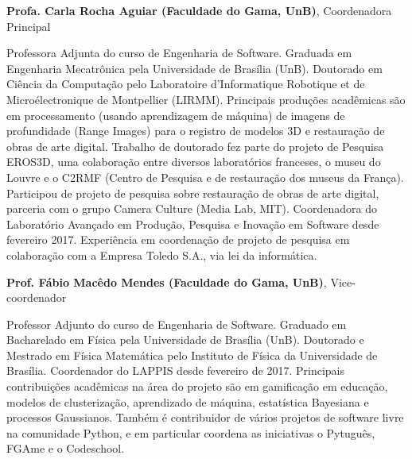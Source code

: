 \textbf{Profa. Carla Rocha Aguiar (Faculdade do Gama, UnB)}, Coordenadora Principal

Professora Adjunta do curso de Engenharia de Software. Graduada em Engenharia Mecatrônica pela Universidade de Brasília (UnB).
Doutorado em Ciência da Computação pelo Laboratoire d'Informatique Robotique et de Microélectronique de Montpellier (LIRMM). 
Principais produções
acadêmicas são em processamento (usando aprendizagem de máquina) de imagens de profundidade (Range Images) para o registro de modelos 3D e
restauração de obras de arte digital. 
Trabalho de doutorado fez parte do projeto de Pesquisa EROS3D, uma colaboração entre diversos laboratórios franceses, o museu do 
Louvre e o C2RMF (Centro de Pesquisa e de restauração dos museus da França). Participou de projeto de pesquisa sobre restauração
de obras de arte digital, parceria com o grupo Camera Culture (Media Lab, MIT).
Coordenadora do Laboratório Avançado em Produção, Pesquisa e Inovação em Software desde fevereiro 2017. 
Experiência em coordenação de projeto de pesquisa em colaboração com a Empresa Toledo S.A., via lei da informática. 


\textbf{Prof. Fábio Macêdo Mendes (Faculdade do Gama, UnB)}, Vice-coordenador 

Professor Adjunto do curso de Engenharia de Software. Graduado em Bacharelado em Física pela Universidade de  Brasília (UnB).
Doutorado e Mestrado em Física Matemática pelo Instituto de Física da Universidade de Brasília. Coordenador do LAPPIS desde fevereiro de 2017.
Principais contribuições acadêmicas na área do projeto são em gamificação em educação, modelos de clusterização, aprendizado de máquina,
estatística Bayesiana e processos Gaussianos. Também é contribuidor de vários projetos de software livre na comunidade Python, e em particular
coordena as iniciativas o Pytuguês, FGAme e o Codeschool.






